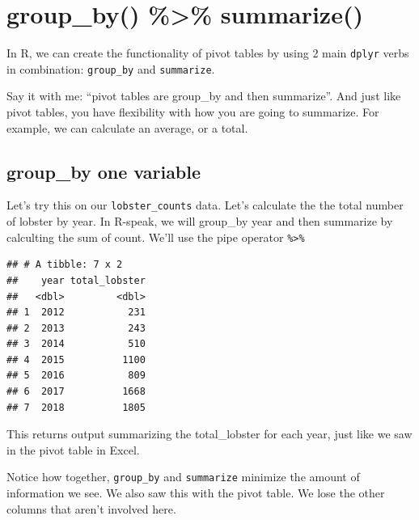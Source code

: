 \documentclass[]{book}
\newenvironment{Shaded}{\begin{snugshade}}{\end{snugshade}}
\newcommand{\CommentTok}[1]{\textcolor[rgb]{0.56,0.35,0.01}{\textit{#1}}}
\newcommand{\DataTypeTok}[1]{\textcolor[rgb]{0.13,0.29,0.53}{#1}}
\newcommand{\KeywordTok}[1]{\textcolor[rgb]{0.13,0.29,0.53}{\textbf{#1}}}
\newcommand{\NormalTok}[1]{#1}
\newcommand{\OperatorTok}[1]{\textcolor[rgb]{0.81,0.36,0.00}{\textbf{#1}}}
\newcommand{\StringTok}[1]{\textcolor[rgb]{0.31,0.60,0.02}{#1}}
\begin{document}
\hypertarget{group_by-summarize}{%
\section{group\_by() \%\textgreater{}\% summarize()}\label{group_by-summarize}}

In R, we can create the functionality of pivot tables by using 2 main \texttt{dplyr} verbs in combination: \texttt{group\_by} and \texttt{summarize}.

Say it with me: ``pivot tables are group\_by and then summarize''. And just like pivot tables, you have flexibility with how you are going to summarize. For example, we can calculate an average, or a total.

\hypertarget{group_by-one-variable}{%
\subsection{group\_by one variable}\label{group_by-one-variable}}

Let's try this on our \texttt{lobster\_counts} data. Let's calculate the the total number of lobster by year. In R-speak, we will group\_by year and then summarize by calculting the sum of count. We'll use the pipe operator \texttt{\%\textgreater{}\%}

\begin{Shaded}
\end{Shaded}

\begin{verbatim}
## # A tibble: 7 x 2
##    year total_lobster
##   <dbl>         <dbl>
## 1  2012           231
## 2  2013           243
## 3  2014           510
## 4  2015          1100
## 5  2016           809
## 6  2017          1668
## 7  2018          1805
\end{verbatim}

This returns output summarizing the total\_lobster for each year, just like we saw in the pivot table in Excel.

Notice how together, \texttt{group\_by} and \texttt{summarize} minimize the amount of information we see. We also saw this with the pivot table. We lose the other columns that aren't involved here.
\end{document}
